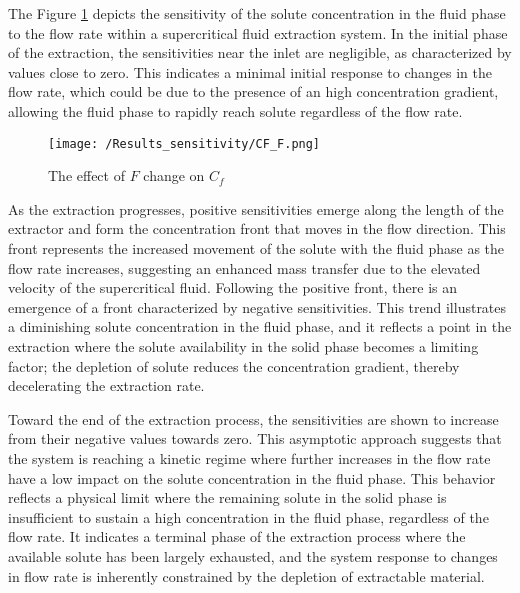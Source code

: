\documentclass[../Article_Sensitivity_Analsysis.tex]{subfiles}
\begin{document}
    
    The Figure \ref{fig:Sensitivty_F_CF} depicts the sensitivity of the solute concentration in the fluid phase to the flow rate within a supercritical fluid extraction system. In the initial phase of the extraction, the sensitivities near the inlet are negligible, as characterized by values close to zero. This indicates a minimal initial response to changes in the flow rate, which could be due to the presence of an high concentration gradient, allowing the fluid phase to rapidly reach solute regardless of the flow rate.
    
    \begin{figure}[h!]
    	\centering
    	\texttt{[image: /Results\_sensitivity/CF\_F.png]}
    	\caption{The effect of $F$ change on $C_f$}
    	\label{fig:Sensitivty_F_CF}
    \end{figure}
    
    As the extraction progresses, positive sensitivities emerge along the length of the extractor and form the concentration front that moves in the flow direction. This front represents the increased movement of the solute with the fluid phase as the flow rate increases, suggesting an enhanced mass transfer due to the elevated velocity of the supercritical fluid. Following the positive front, there is an emergence of a front characterized by negative sensitivities. This trend illustrates a diminishing solute concentration in the fluid phase, and it reflects a point in the extraction where the solute availability in the solid phase becomes a limiting factor; the depletion of solute reduces the concentration gradient, thereby decelerating the extraction rate. 
    
    Toward the end of the extraction process, the sensitivities are shown to increase from their negative values towards zero. This asymptotic approach suggests that the system is reaching a kinetic regime where further increases in the flow rate have a low impact on the solute concentration in the fluid phase. This behavior reflects a physical limit where the remaining solute in the solid phase is insufficient to sustain a high concentration in the fluid phase, regardless of the flow rate. It indicates a terminal phase of the extraction process where the available solute has been largely exhausted, and the system response to changes in flow rate is inherently constrained by the depletion of extractable material.
    
\end{document}
